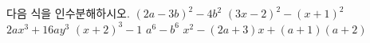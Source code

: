 다음 식을 인수분해하시오.
 $(2a-3b)^2-4b^2$
 $(3x-2)^2-(x+1)^2$
 $2ax^3+16ay^3$
 $(x+2)^3-1$
 $a^6-b^6$
 $x^2-(2a+3)x+(a+1)(a+2)$
